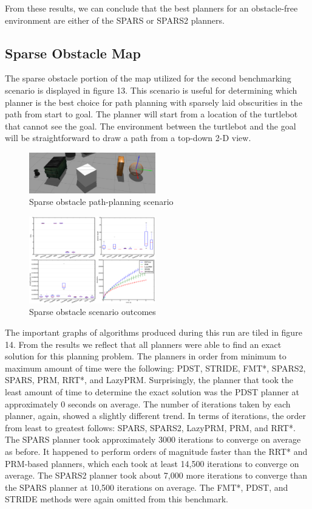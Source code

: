 \documentclass[conference]{IEEEtran} \usepackage[T1]{fontenc} \usepackage[backend=biber, style=ieee]{biblatex}
\begin{document}
From these results, we can conclude that the best planners for an obstacle-free environment are either of the SPARS or SPARS2 planners.

\subsection{Sparse Obstacle Map} \label{Sparse Obstacle Map}

The sparse obstacle portion of the map utilized for the second benchmarking scenario is displayed in figure 13. This scenario is useful for determining which planner is 
the best choice for path planning with sparsely laid obscurities in the path from start to goal. The planner will start from a location of the turtlebot that cannot see
the goal. The environment between the turtlebot and the goal will be straightforward to draw a path from a top-down 2-D view.

\begin{figure}
\label{figure13} 
\centering 
\includegraphics[width=0.49\textwidth]{scenario_2}
\caption{Sparse obstacle path-planning scenario}
\end{figure}

\begin{figure}
\label{figure14} 
\centering 
\includegraphics[width=0.49\textwidth]{s2_outcomes}
\caption{Sparse obstacle scenario outcomes}
\end{figure}

The important graphs of algorithms produced during this run are tiled in figure 14. From the results we reflect that all planners were able to find an exact solution
for this planning problem. The planners in order from minimum to maximum amount of time were the following: PDST, STRIDE, FMT*, SPARS2, SPARS, PRM, RRT*, and LazyPRM. 
Surprisingly, the planner that took the least amount of time to determine the exact solution was the PDST planner at approximately 0 seconds on average. The number
of iterations taken by each planner, again, showed a slightly different trend. In terms of iterations, the order from least to greatest follows: SPARS, SPARS2, LazyPRM, PRM,
and RRT*. The SPARS planner took approximately 3000 iterations to converge on average as before. It happened to perform orders of magnitude faster than the RRT* and PRM-based 
planners, which each took at least 14,500 iterations to converge on average. The SPARS2 planner took about 7,000 more iterations to converge than the SPARS planner at 10,500 
iterations on average. The FMT*, PDST, and STRIDE methods were again omitted from this benchmark.
\end{document}
